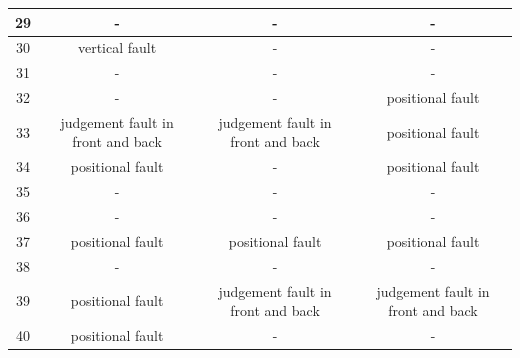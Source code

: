 \documentclass[twocolumn,11pt]{report}
\begin{document}
\begin{table}[ht]
{\begin{tabular}{|c|c|c|c|}
    29              & -                                 & -                                 & -                                 \\ \hline
    30              & vertical fault                    & -                                 & -                                 \\ \hline
    31              & -                                 & -                                 & -                                 \\ \hline
    32              & -                                 & -                                 & positional fault                  \\ \hline
    33              & judgement fault in front and back & judgement fault in front and back & positional fault                  \\ \hline
    34              & positional fault                  & -                                 & positional fault                  \\ \hline
    35              & -                                 & -                                 & -                                 \\ \hline
    36              & -                                 & -                                 & -                                 \\ \hline
    37              & positional fault                  & positional fault                  & positional fault                  \\ \hline
    38              & -                                 & -                                 & -                                 \\ \hline
    39              & positional fault                  & judgement fault in front and back & judgement fault in front and back \\ \hline
    40              & positional fault                  & -                                 & -                                 \\ \hline
    \end{tabular}%
    }
\end{table}
\end{document}
